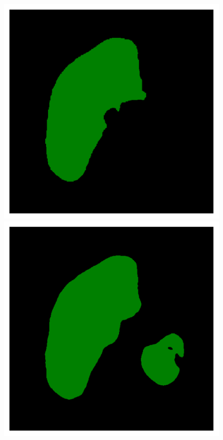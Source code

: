{\begin{figure}[!ht]
\begin{mdframed}[backgroundcolor=blue!50,linecolor=blue!50]
\begin{minipage}{4cm}
	\end{minipage} \hspace{-0.3cm}
	\begin{minipage}{4cm}
		\includegraphics[width=\linewidth]{images/LiverVE_GT_Pat4_5}
	\end{minipage} \hspace{-0.3cm}
	\begin{minipage}{4cm}
		\includegraphics[width=\linewidth]{images/LiverVE_Pred_Pat4_5}

\end{minipage}
\end{mdframed}
\end{figure}}
